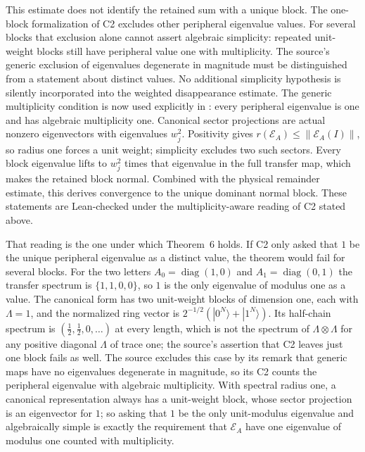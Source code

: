 \documentclass{article}
\begin{document}
This estimate does not identify the retained sum with a unique block.
The one-block formalization of C2 excludes other peripheral eigenvalue
values. For several blocks that exclusion alone cannot assert algebraic
simplicity: repeated unit-weight blocks still have peripheral value one
with multiplicity. The source's generic exclusion of eigenvalues degenerate
in magnitude must be distinguished from a statement about distinct values.
No additional simplicity hypothesis is silently incorporated into the
weighted disappearance estimate. The generic multiplicity condition is now used explicitly in
:
every peripheral eigenvalue is one and has algebraic multiplicity one.
Canonical sector projections are actual nonzero eigenvectors with eigenvalues
$w_j^2$. Positivity gives $r(\mathcal E_A)\leq\|\mathcal E_A(I)\|$,
so radius one forces a unit weight; simplicity excludes two such sectors.
Every block eigenvalue lifts to $w_j^2$ times that eigenvalue in the full
transfer map, which makes the retained block normal. Combined with the
physical remainder estimate, this derives convergence to the unique dominant
normal block. These statements are Lean-checked under the multiplicity-aware
reading of C2 stated above.

That reading is the one under which Theorem~6 holds. If C2 only asked that
$1$ be the unique peripheral eigenvalue as a distinct value, the theorem
would fail for several blocks. For the two letters
$A_0=\operatorname{diag}(1,0)$ and $A_1=\operatorname{diag}(0,1)$ the
transfer spectrum is $\{1,1,0,0\}$, so $1$ is the only eigenvalue of
modulus one as a value. The canonical form has two unit-weight blocks of
dimension one, each with $\Lambda=1$, and the normalized ring vector is
$2^{-1/2}(|0^N\rangle+|1^N\rangle)$. Its half-chain spectrum is
$(\tfrac12,\tfrac12,0,\ldots)$ at every length, which is not the
spectrum of $\Lambda\otimes\Lambda$ for any positive diagonal $\Lambda$
of trace one; the source's assertion that C2 leaves just one block fails
as well. The source excludes this case by its remark that generic maps
have no eigenvalues degenerate in magnitude, so its C2 counts the
peripheral eigenvalue with algebraic multiplicity. With spectral radius
one, a canonical representation always has a unit-weight block, whose
sector projection is an eigenvector for $1$; so asking that $1$ be the only
unit-modulus eigenvalue and algebraically simple is exactly the requirement
that $\mathcal E_A$ have one eigenvalue of modulus one counted with
multiplicity.
\end{document}
